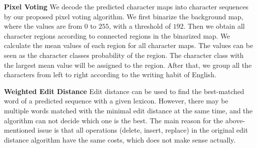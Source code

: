 \documentclass[runningheads]{llncs}
\begin{document}


\noindent\textbf{Pixel Voting} We decode the predicted character maps into character sequences by our proposed pixel voting algorithm. We first binarize the background map, where the values are from $0$ to $255$, with a threshold of $192$. 
Then we obtain all character regions according to connected regions in the binarized map. We calculate the mean values of each region for all character maps. The values can be seen as the character classes probability of the region. The character class with the largest mean value will be assigned to the region. After that, we group all the characters from left to right according to the writing habit of English. 

\noindent\textbf{Weighted Edit Distance} Edit distance can be used to find the best-matched word of a predicted sequence with a given lexicon. However, there may be multiple words matched with the minimal edit distance at the same time, and the algorithm can not decide which one is the best. The main reason for the above-mentioned issue is that all operations (delete, insert, replace) in the original edit distance algorithm have the same costs, which does not make sense actually. 
\end{document}
